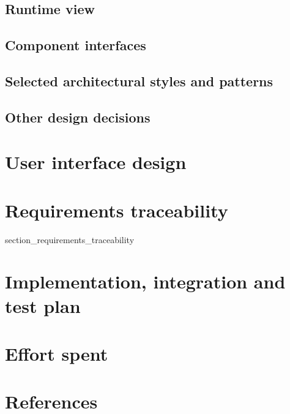 \documentclass[a4paper]{article}
\begin{document}
\subsection{Runtime view}
\subsection{Component interfaces}
\subsection{Selected architectural styles and patterns}
\subsection{Other design decisions}

\newpage
\section{User interface design}

\newpage
\section{Requirements traceability}
{section_requirements_traceability}



\newpage
\section{Implementation, integration and test plan}
\newpage
\section{Effort spent}
\section{References}
\end{document}
